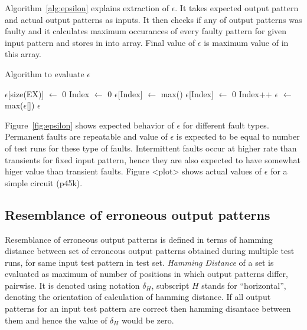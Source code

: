 Algorithm~\ref{alg:epsilon} explains extraction of $\epsilon$. It takes expected output pattern and actual output patterns as inputs. It then checks if any of output patterns was faulty and it calculates maximum occurances of every faulty pattern for given input pattern and stores in into array. Final value of $\epsilon$ is maximum value of in this array.

\begin{algorithm}[H]
  \caption{Algorithm to evaluate $\epsilon$}
  \label{alg:epsilon}
  \begin{algorithmic}
 \State $\epsilon$[size(EX)] $\leftarrow$ 0\;
 \State Index $\leftarrow$ 0\;
   \State $\epsilon$[Index] $\leftarrow$ max()\;
  \Else
   \State $\epsilon$[Index] $\leftarrow$ 0\;
  \EndIf
  \State Index++\;
 \EndWhile
 \State$\epsilon$ $\leftarrow$ max($\epsilon$[])\;
 \State \Return $\epsilon$\;
 \EndProcedure
 \end{algorithmic}
\end{algorithm}

Figure~\ref{fig:epsilon} shows expected behavior of $\epsilon$ for different fault types. Permanent faults are repeatable and value of $\epsilon$ is expected to be equal to number of test runs for these type of faults. Intermittent faults occur at higher rate than transients for fixed input pattern, hence they are also expected to have somewhat higer value than transient faults. Figure <plot> shows actual values of $\epsilon$ for a simple circuit (p45k).

\subsection{Resemblance of erroneous output patterns}
Resemblance of erroneous output patterns is defined in terms of hamming distance between set of erroneous output patterns obtained during multiple test runs, for same input test pattern in test set. \emph{Hamming Distance} of a set is evaluated as maximum of number of positions in which output patterns differ, pairwise. It is denoted using notation $\delta_H$, subscript $H$ stands for \enquote{horizontal}, denoting the orientation of calculation of hamming distance. If all output patterns for an input test pattern are correct then hamming disantace between them and hence the value of $\delta_H$ would be zero.

